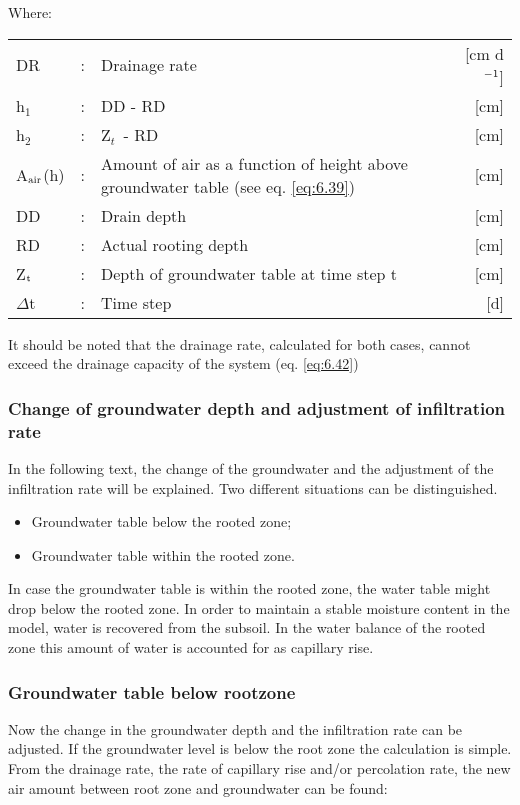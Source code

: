 Where:\\[5pt]
\begin{tabularx}{\textwidth}{llXr}
DR &:& Drainage rate  & [cm d$^{{\rm -1}}$]\\
h$_{1}$ &:& DD - RD & [cm]\\
h$_{2}$ &:& Z$_{t~}$ - RD & [cm]\\
A$_{{\rm air}}$(h) &:& Amount of air as a function of height above groundwater
   table  (see eq. \ref{eq:6.39}) & [cm]\\
DD &:& Drain depth  & [cm]\\
RD &:& Actual rooting depth  & [cm]\\
Z$_{{\rm t}}$ &:& Depth of groundwater table at time step t  & [cm]\\
$\Delta$t &:& Time step  & [d]\\
\end{tabularx}

It should be noted that the drainage rate, calculated for both cases, cannot exceed the
drainage capacity of the system (eq. \ref{eq:6.42})

\subsubsection{Change of groundwater depth and adjustment of infiltration rate}

In the following text, the change of the groundwater and the adjustment of the infiltration
rate will be explained. Two different situations can be distinguished.
\begin{itemize}
\item Groundwater table below the rooted zone;
\item Groundwater table within the rooted zone.
\end{itemize}

In case the groundwater table is within the rooted zone, the water table might drop below
the rooted zone. In order to maintain a stable moisture content in the model, water is
recovered from the subsoil. In the water balance of the rooted zone this amount of water
is accounted for as capillary rise.

\subsubsection{Groundwater table below rootzone}
Now the change in the groundwater depth and the infiltration rate can be adjusted. If the
groundwater level is below the root zone the calculation is simple. From the drainage
rate, the rate of capillary rise and/or percolation rate, the new air amount between root
zone and groundwater can be found:

